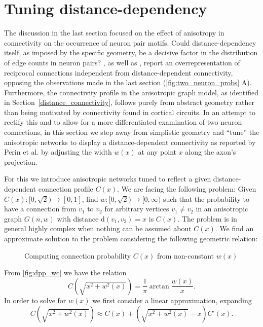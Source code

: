 \newpage
\section{Tuning distance-dependency}

The discussion in the last section focused on the effect of anisotropy
in connectivity on the occurrence of neuron pair motifs. Could
distance-dependency itself, as imposed by the specific geometry, be a
decisive factor in the distribution of edge counts in neuron pairs?
\textcite{Song2005}, as well as \textcite{Perin2011}, report an
overrepresentation of reciprocal connections independent from
distance-dependent connectivity, opposing the observations made in the
last section (\autoref{fig:two_neuron_probs} A). Furthermore, the
connectivity profile in the anisotropic graph model, as identified in
Section~\ref{distance_connectivity}, follows purely from abstract
geometry rather than being motivated by connectivity found in cortical
circuits. In an attempt to rectify this and to allow for a more
differentiated examination of two neuron connections, in this section
we step away from simplistic geometry and \enquote{tune} the
anisotropic networks to display a distance-dependent connectivity as
reported by Perin et al. by adjusting the width $w(x)$ at any point
$x$ along the axon's projection.

For this we introduce anisotropic networks tuned to reflect a given
distance-dependent connection profile $C(x)$. We are facing the
following problem: Given $C(x):[0,\sqrt{2}) \to [0,1]$, find
$w:[0,\sqrt{2}) \to [0,\infty)$ such that the probability to have a
connection from $v_1$ to $v_2$ for arbitrary vertices $v_1 \neq v_2$
in an anisotropic graph $G(n,w)$ with distance $\mathrm{d}(v_1,v_2) =
x$ is $C(x)$. The problem is in general highly complex when nothing
can be assumed about $C(x)$. We find an approximate solution to the
problem considering the following geometric relation:

\begin{figure}[htp]
  \centering
  \caption{Computing connection probability $C(x)$ from non-constant
    $w(x)$}
  \label{fig:dpp_wc}
\end{figure}

From \autoref{fig:dpp_wc} we have the relation  
\begin{equation}
C\left(\sqrt{x^2+w^2(x)}\right) = \frac{1}{\pi} \operatorname{arctan}
\frac{w(x)}{x}. \label{eq:geo_rel}
\end{equation} 
In order to solve for $w(x)$ we first consider a linear approximation,
expanding
\[C\left(\sqrt{x^2+w^2(x)}\right) \approx C(x) + \left(\sqrt{x^2+w^2(x)} -
x\right) C'(x).\]

